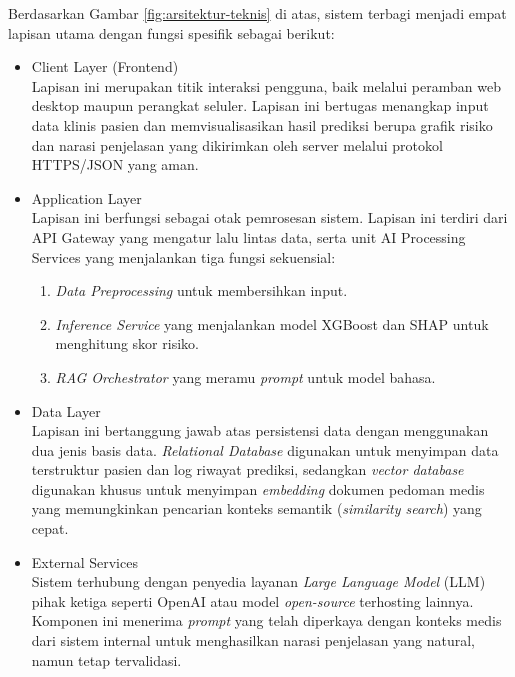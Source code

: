 Berdasarkan Gambar \ref{fig:arsitektur-teknis} di atas, sistem terbagi menjadi empat lapisan utama dengan fungsi spesifik sebagai berikut:

\begin{itemize}
    \item Client Layer (Frontend) \\
    Lapisan ini merupakan titik interaksi pengguna, baik melalui peramban web desktop maupun perangkat seluler. Lapisan ini bertugas menangkap input data klinis pasien dan memvisualisasikan hasil prediksi berupa grafik risiko dan narasi penjelasan yang dikirimkan oleh server melalui protokol HTTPS/JSON yang aman.

    \item Application Layer \\
    Lapisan ini berfungsi sebagai otak pemrosesan sistem. Lapisan ini terdiri dari API Gateway yang mengatur lalu lintas data, serta unit AI Processing Services yang menjalankan tiga fungsi sekuensial:
    \begin{enumerate}
        \item \textit{Data Preprocessing} untuk membersihkan input.
        \item \textit{Inference Service} yang menjalankan model XGBoost dan SHAP untuk menghitung skor risiko.
        \item \textit{RAG Orchestrator} yang meramu \textit{prompt} untuk model bahasa.
    \end{enumerate}

    \item Data Layer \\
    Lapisan ini bertanggung jawab atas persistensi data dengan menggunakan dua jenis basis data. \textit{Relational Database} digunakan untuk menyimpan data terstruktur pasien dan log riwayat prediksi, sedangkan \textit{vector database} digunakan khusus untuk menyimpan \textit{embedding} dokumen pedoman medis yang memungkinkan pencarian konteks semantik (\textit{similarity search}) yang cepat.

    \item External Services \\
    Sistem terhubung dengan penyedia layanan \textit{Large Language Model} (LLM) pihak ketiga seperti OpenAI atau model \textit{open-source} terhosting lainnya. Komponen ini menerima \textit{prompt} yang telah diperkaya dengan konteks medis dari sistem internal untuk menghasilkan narasi penjelasan yang natural, namun tetap tervalidasi.
\end{itemize}

